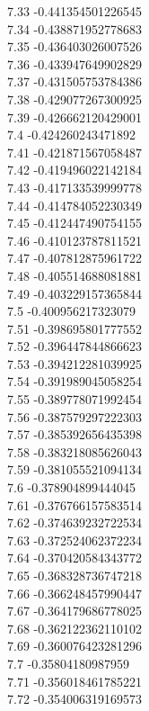 {7.33	-0.441354501226545\\
7.34	-0.438871952778683\\
7.35	-0.436403026007526\\
7.36	-0.433947649902829\\
7.37	-0.431505753784386\\
7.38	-0.429077267300925\\
7.39	-0.426662120429001\\
7.4	-0.424260243471892\\
7.41	-0.421871567058487\\
7.42	-0.419496022142184\\
7.43	-0.417133539999778\\
7.44	-0.414784052230349\\
7.45	-0.412447490754155\\
7.46	-0.410123787811521\\
7.47	-0.407812875961722\\
7.48	-0.405514688081881\\
7.49	-0.403229157365844\\
7.5	-0.400956217323079\\
7.51	-0.398695801777552\\
7.52	-0.396447844866623\\
7.53	-0.394212281039925\\
7.54	-0.391989045058254\\
7.55	-0.389778071992454\\
7.56	-0.387579297222303\\
7.57	-0.385392656435398\\
7.58	-0.383218085626043\\
7.59	-0.381055521094134\\
7.6	-0.378904899444045\\
7.61	-0.376766157583514\\
7.62	-0.374639232722534\\
7.63	-0.372524062372234\\
7.64	-0.370420584343772\\
7.65	-0.368328736747218\\
7.66	-0.366248457990447\\
7.67	-0.364179686778025\\
7.68	-0.362122362110102\\
7.69	-0.360076423281296\\
7.7	-0.35804180987959\\
7.71	-0.356018461785221\\
7.72	-0.354006319169573\\
}
